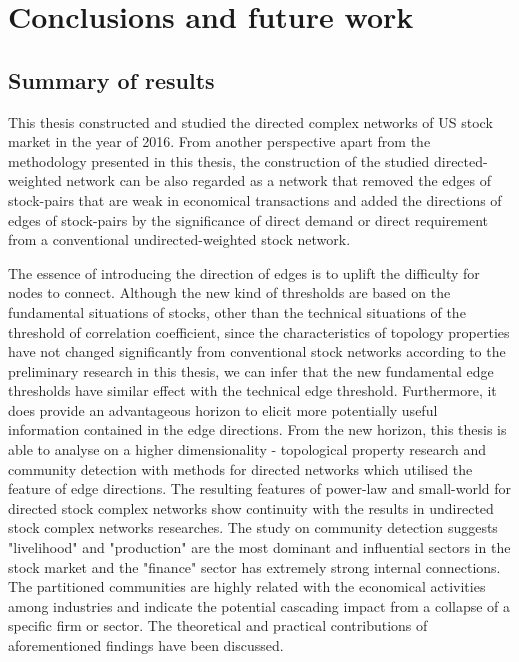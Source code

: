 \chapter[Conclusions]{Conclusions and future work}
\label{cpt:conclude}
\section{Summary of results}
This thesis constructed and studied the directed complex networks of US stock market in the year of 2016. From another perspective apart from the methodology presented in this thesis, the construction of the studied directed-weighted network can be also regarded as a network that removed the edges of stock-pairs that are weak in economical transactions and added the directions of edges of stock-pairs by the significance of direct demand or direct requirement from a conventional undirected-weighted stock network.

The essence of introducing the direction of edges is to uplift the difficulty for nodes to connect. Although the new kind of thresholds are based on the fundamental situations of stocks, other than the technical situations of the threshold of correlation coefficient, since the characteristics of topology properties have not changed significantly from conventional stock networks according to the preliminary research in this thesis, we can infer that the new fundamental edge thresholds have similar effect with the technical edge threshold. Furthermore, it does provide an advantageous horizon to elicit more potentially useful information contained in the edge directions. From the new horizon, this thesis is able to analyse on a higher dimensionality - topological property research and community detection with methods for directed networks which utilised the feature of edge directions. The resulting features of power-law and small-world for directed stock complex networks show continuity with the results in undirected stock complex networks researches. The study on community detection suggests "livelihood" and "production" are the most dominant and influential sectors in the stock market and the "finance" sector has extremely strong internal connections. The partitioned communities are highly related with the economical activities among industries and indicate the potential cascading impact from a collapse of a specific firm or sector. The theoretical and practical contributions of aforementioned findings have been discussed.


